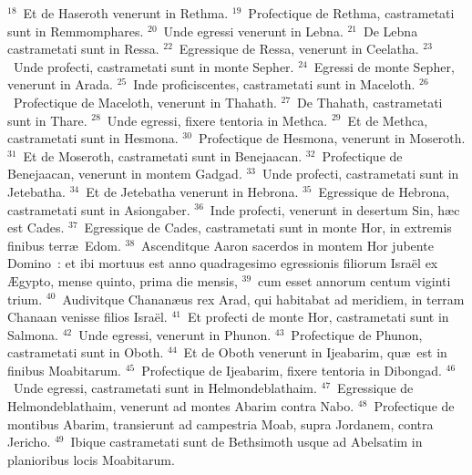 ${}^{18}$~Et de Haseroth venerunt in Rethma.
${}^{19}$~Profectique de Rethma, castrametati sunt in Remmomphares.
${}^{20}$~Unde egressi venerunt in Lebna.
${}^{21}$~De Lebna castrametati sunt in Ressa.
${}^{22}$~Egressique de Ressa, venerunt in Ceelatha.
${}^{23}$~Unde profecti, castrametati sunt in monte Sepher.
${}^{24}$~Egressi de monte Sepher, venerunt in Arada.
${}^{25}$~Inde proficiscentes, castrametati sunt in Maceloth.
${}^{26}$~Profectique de Maceloth, venerunt in Thahath.
${}^{27}$~De Thahath, castrametati sunt in Thare.
${}^{28}$~Unde egressi, fixere tentoria in Methca.
${}^{29}$~Et de Methca, castrametati sunt in Hesmona.
${}^{30}$~Profectique de Hesmona, venerunt in Moseroth.
${}^{31}$~Et de Moseroth, castrametati sunt in Benejaacan.
${}^{32}$~Profectique de Benejaacan, venerunt in montem Gadgad.
${}^{33}$~Unde profecti, castrametati sunt in Jetebatha.
${}^{34}$~Et de Jetebatha venerunt in Hebrona.
${}^{35}$~Egressique de Hebrona, castrametati sunt in Asiongaber.
${}^{36}$~Inde profecti, venerunt in desertum Sin, h\ae c est Cades.
${}^{37}$~Egressique de Cades, castrametati sunt in monte Hor, in extremis finibus terr\ae\ Edom.
${}^{38}$~Ascenditque Aaron sacerdos in montem Hor jubente Domino~: et ibi mortuus est anno quadragesimo egressionis filiorum Isra\"el ex \AE gypto, mense quinto, prima die mensis,
${}^{39}$~cum esset annorum centum viginti trium.
${}^{40}$~Audivitque Chanan\ae us rex Arad, qui habitabat ad meridiem, in terram Chanaan venisse filios Isra\"el.
${}^{41}$~Et profecti de monte Hor, castrametati sunt in Salmona.
${}^{42}$~Unde egressi, venerunt in Phunon.
${}^{43}$~Profectique de Phunon, castrametati sunt in Oboth.
${}^{44}$~Et de Oboth venerunt in Ijeabarim, qu\ae\ est in finibus Moabitarum.
${}^{45}$~Profectique de Ijeabarim, fixere tentoria in Dibongad.
${}^{46}$~Unde egressi, castrametati sunt in Helmondeblathaim.
${}^{47}$~Egressique de Helmondeblathaim, venerunt ad montes Abarim contra Nabo.
${}^{48}$~Profectique de montibus Abarim, transierunt ad campestria Moab, supra Jordanem, contra Jericho.
${}^{49}$~Ibique castrametati sunt de Bethsimoth usque ad Abelsatim in planioribus locis Moabitarum.


